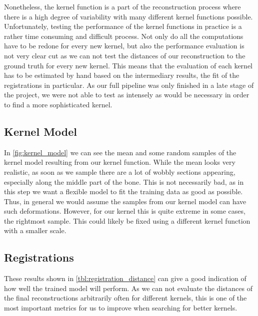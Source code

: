 Nonetheless, the kernel function is a part of the reconstruction process where there is a high degree of variability with many different kernel functions possible. 
Unfortunately, testing the performance of the kernel functions in practice is a rather time consuming and difficult process.
Not only do all the computations have to be redone for every new kernel, but also the performance evaluation is not very clear cut as we can not test the distances of our reconstruction to the ground truth for every new kernel.
This means that the evaluation of each kernel has to be estimated by hand based on the intermediary results, the fit of the registrations in particular. 
As our full pipeline was only finished in a late stage of the project, we were not able to test as intensely as would be necessary in order to find a more sophisticated kernel.


\subsection{Kernel Model}
\label{subsec:kernmodeldisc}

In \autoref{fig:kernel_model} we can see the mean and some random samples of the kernel model resulting from our kernel function. 
While the mean looks very realistic, as soon as we sample there are a lot of wobbly sections appearing, especially along the middle part of the bone. 
This is not necessarily bad, as in this step we want a flexible model to fit the training data as good as possible.
Thus, in general we would assume the samples from our kernel model can have such deformations.
However, for our kernel this is quite extreme in some cases, \eg the rightmost sample.
This could likely be fixed using a different kernel function with a smaller scale.


\subsection{Registrations}
\label{subsec:registrresultsdisc}
These results shown in \autoref{tbl:registration_distance} can give a good indication of how well the trained model will perform.
As we can not evaluate the distances of the final reconstructions arbitrarily often for different kernels, this is one of the most important metrics for us to improve when searching for better kernels.

